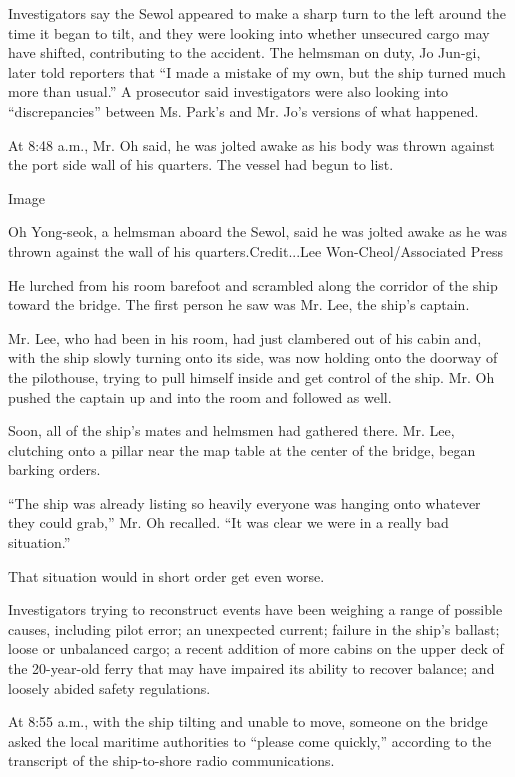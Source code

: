 Investigators say the Sewol appeared to make a sharp turn to the left
around the time it began to tilt, and they were looking into whether
unsecured cargo may have shifted, contributing to the accident. The
helmsman on duty, Jo Jun-gi, later told reporters that ``I made a
mistake of my own, but the ship turned much more than usual.'' A
prosecutor said investigators were also looking into ``discrepancies''
between Ms. Park's and Mr. Jo's versions of what happened.

At 8:48 a.m., Mr. Oh said, he was jolted awake as his body was thrown
against the port side wall of his quarters. The vessel had begun to
list.

Image

Oh Yong-seok, a helmsman aboard the Sewol, said he was jolted awake as
he was thrown against the wall of his quarters.Credit...Lee
Won-Cheol/Associated Press

He lurched from his room barefoot and scrambled along the corridor of
the ship toward the bridge. The first person he saw was Mr. Lee, the
ship's captain.

Mr. Lee, who had been in his room, had just clambered out of his cabin
and, with the ship slowly turning onto its side, was now holding onto
the doorway of the pilothouse, trying to pull himself inside and get
control of the ship. Mr. Oh pushed the captain up and into the room and
followed as well.

Soon, all of the ship's mates and helmsmen had gathered there. Mr. Lee,
clutching onto a pillar near the map table at the center of the bridge,
began barking orders.

``The ship was already listing so heavily everyone was hanging onto
whatever they could grab,'' Mr. Oh recalled. ``It was clear we were in a
really bad situation.''

That situation would in short order get even worse.

Investigators trying to reconstruct events have been weighing a range of
possible causes, including pilot error; an unexpected current; failure
in the ship's ballast; loose or unbalanced cargo; a recent addition of
more cabins on the upper deck of the 20-year-old ferry that may have
impaired its ability to recover balance; and loosely abided safety
regulations.

At 8:55 a.m., with the ship tilting and unable to move, someone on the
bridge asked the local maritime authorities to ``please come quickly,''
according to the transcript of the ship-to-shore radio communications.


